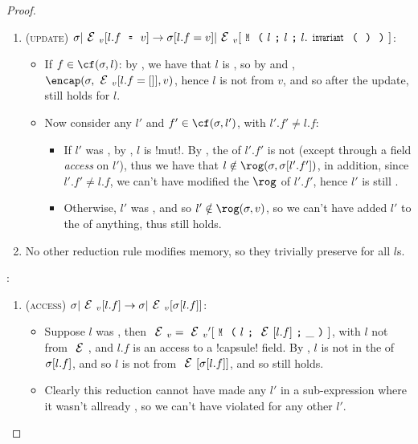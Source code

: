 \begin{proof}
\begin{ienumerate}
\begin{enumerate}
	\item (\textsc{update}) $\s|\EV[l.f\equals{}v]\rightarrow \s[l.f=v]|\EV[\M{l}{l}{l.\invariant}]$:
	\begin{itemize}
		\item If $f \in \cf(\s, l)$:  by , we have that $l$ is \muty, so by  and , $\encap(\s, \EV[l.f = \square], v)$, hence $l$ is not \reach from $v$, and so after the update, \HNC still holds for $l$.
		\item Now consider any $l'$ and $f' \in \cf(\s, l')$, with $l'.f' \neq l.f$:
		\begin{itemize}
			\item If $l'$ was \WE, by , $l$ is \Q!mut!. By \WE, the \rog of $l'.f'$ is not \muty (except through a field \emph{access} on $l'$), thus we have that $l \notin \rog(\s, \s[l'.f'])$, in addition, since $l'.f' \neq l.f$, we can't have modified the $\rog$ of $l'.f'$, hence $l'$ is still \HNC.
			\item Otherwise, $l'$ was \HNO, and so $l' \notin \rog(\s, v)$, so we can't have added $l'$ to the \rog of anything, thus \HNC still holds.
		\end{itemize}
	\end{itemize}
	\item No other reduction rule modifies memory, so they trivially preserve \HNC for all $l$s.
\end{enumerate}

\item \HNO:
\begin{enumerate}
	\item (\textsc{access}) $\s|\EV[l.f]\rightarrow \s|\EV[\s[l.f]]$:
	\begin{itemize}
		\item Suppose $l$ was \HNO, then $\EV = \EV'[\M{l}{\E[l.f]}{\_}]$, with $l$ not \reach from $\E$, and $l.f$ is an access to a \Q!capsule! field. By \HNC, $l$ is not in the \rog of $\sigma[l.f]$, and so $l$ is not \reach from $\E[\s[l.f]]$, and so \HNO still holds.
		\item Clearly this reduction cannot have made any $l'$ \reach in a sub-expression where it wasn't allready \reach, so we can't have violated \HNO for any other $l'$.
	\end{itemize}



\end{enumerate}
\end{ienumerate}
\end{proof}
